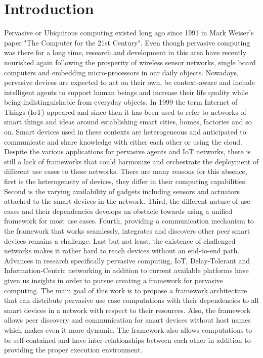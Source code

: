 
\chapter{Introduction}\label{chapter:introduction}
 Pervasive or Ubiquitous computing existed long ago since 1991 in Mark Weiser's paper "The Computer for the 21st Century". Even though pervasive computing  was there for a long time, research and development in this area have recently nourished again following the  prosperity of wireless sensor networks, single board computers and embedding micro-processors in our daily objects. Nowadays, pervasive devices are expected to act on their own, be context-aware and include intelligent agents to support human beings and increase their life quality while being indistinguishable from  everyday objects. In 1999 the term Internet of Things (IoT) appeared and since then it has been used to refer to networks of smart things and  ideas around establishing smart cities, homes, factories and so on. Smart devices used in these contexts are heterogeneous and  anticipated to communicate and share knowledge with either each other or using the cloud. Despite the various applications for pervasive agents and IoT networks, there is still a lack of frameworks that could harmonize and orchestrate the deployment of different use cases to these networks. There are many reasons for this absence, first is the heterogeneity of devices, they differ in their computing capabilities. Second is the varying  availability of gadgets including sensors and actuators attached to the smart devices in the network. Third, the different nature of use cases and their dependencies develops an obstacle towards using a unified framework for most use cases. Fourth, providing a communication mechanism to the framework that works seamlessly, integrates and discovers other peer smart devices remains a challenge. Last but not least, the existence of challenged networks makes it rather hard to reach devices without an end-to-end path. Advances in research specifically  pervasive computing, IoT, Delay-Tolerant and Information-Centric networking in addition to current available platforms have given us insights in order to pursue creating a framework for pervasive computing. The main goal of this work is to propose a framework architecture that can distribute  pervasive use case computations with their dependencies to all smart devices in a network with respect to their resources. Also, the framework allows peer discovery and communication for  smart devices without host names which makes even it more dynamic. The framework also allows computations to  be self-contained and have inter-relationships between each other in addition to providing the proper execution environment. 